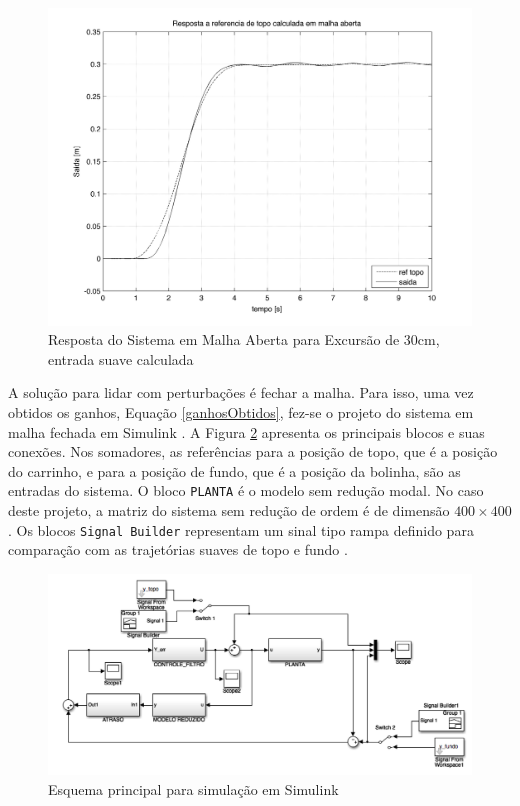 \begin{figure}[!htb]
\begin{minipage}{0.45\textwidth}
        \includegraphics[width=1\linewidth]{figs/resultados/simulacao/respostaMalhaAbertaRefTopo}
        \caption{Resposta do Sistema em Malha Aberta para Excursão de 30cm, entrada suave calculada\label{respostaMalhaAbertaEntradaSuave}}
    \end{minipage}
\end{figure}

 A solução para lidar com perturbações é fechar a malha. Para isso, uma vez obtidos os ganhos, Equação \ref{ganhosObtidos}, fez-se o projeto do sistema em malha fechada em Simulink \cite{simulink}. A Figura \ref{topModel} apresenta os principais blocos e suas conexões. Nos somadores, as referências para a posição de topo, que é a posição do carrinho, e para a posição de fundo, que é a posição da bolinha, são as entradas do sistema. O bloco \texttt{PLANTA} é o modelo sem redução modal. No caso deste projeto, a matriz do sistema sem redução de ordem é de dimensão $400\times 400$. Os blocos \texttt{Signal Builder} representam um sinal tipo rampa definido para comparação com as trajetórias suaves de topo e fundo \cite{rafaelMestrado}. 
 

\begin{figure}[!ht]
\centering

\includegraphics[width=0.9\linewidth]{figs/resultados/simulink/top}
\caption{Esquema principal para simulação em Simulink\label{topModel}}
\end{figure}

